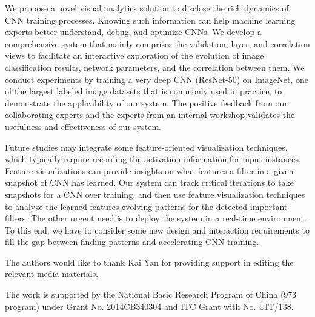 \documentclass[format=acmsmall, review=false, screen=true]{acmart}
\begin{document}
We propose a novel visual analytics solution to disclose the rich dynamics of CNN training processes. Knowing such information can help machine learning experts better understand, debug, and optimize CNNs. We develop a comprehensive system that mainly comprises the validation, layer, and correlation views to facilitate an interactive exploration of the evolution of image classification results, network parameters, and the correlation between them.
We conduct experiments by training a very deep CNN (ResNet-50) on ImageNet, one of the largest labeled image datasets that is commonly used in practice, to demonstrate the applicability of our system. The positive feedback from our collaborating experts and the experts from an internal workshop validates the usefulness and effectiveness of our system.


Future studies may integrate some feature-oriented visualization techniques, which typically require recording the activation information for input instances. Feature visualizations can provide insights on what features a filter in a given snapshot of CNN has learned. Our system can track critical iterations to take snapshots for a CNN over training, and then use feature visualization techniques to analyze the learned features evolving patterns for the detected important filters. The other urgent need is to deploy the system in a real-time environment. To this end, we have to consider some new design and interaction requirements to fill the gap between finding patterns and accelerating CNN training.%

\begin{acks}

	The authors would like to thank Kai Yan for providing support in editing the relevant media materials.

	The work is supported by the National Basic Research Program of China (973 program) under Grant No. 2014CB340304
	and ITC Grant with No. UIT/138.


\end{acks}


%

\end{document}
